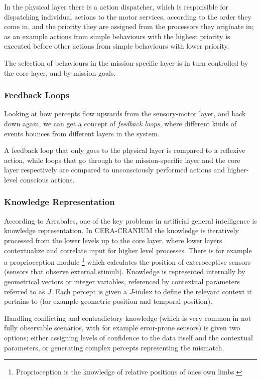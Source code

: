 In the physical layer there is a action dispatcher, which is responsible for
dispatching individual actions to the motor services, according to the order
they come in, and the priority they are assigned from the processors they
originate in; as an example actions from simple behaviours with the highest
priority is executed before other actions from simple behaviours with lower
priority.

The selection of behaviours in the mission-specific layer is in turn controlled
by the core layer, and by mission goals.

\subsubsection{Feedback Loops}
Looking at how percepts flow upwards from the sensory-motor layer, and back
down again, we can get a concept of \textit{feedback loops}, where different
kinds of events bounces from different layers in the system.

A feedback loop that only goes to the physical layer is compared to a reflexive
action, while loops that go through to the mission-specific layer and the core
layer respectively are compared to unconsciously performed actions and
higher-level conscious actions.

\subsubsection{Knowledge Representation}
According to Arrabales\cite{arrabales2009ceracranium}, one of the key problems
in artificial general intelligence is knowledge representation. In CERA-CRANIUM
the knowledge is iteratively processed from the lower levels up to the core
layer, where lower layers contextualize and correlate input for higher level
processes. There is for example a proprioception module \footnote{Proprioception
is the knowledge of relative positions of ones own limbs.} which calculates the
position of exteroceptive sensors (sensors that observe external stimuli).
Knowledge is represented internally by geometrical vectors or integer variables,
referenced by contextual parameters referred to as $J$. Each percept is given a
$J$-index to define the relevant context it pertains to (for example geometric
position and temporal position).

Handling conflicting and contradictory knowledge (which is very common in not
fully observable scenarios, with for example error-prone sensors) is given two
options; either assigning levels of confidence to the data itself and the
contextual parameters, or generating complex percepts representing the mismatch.


